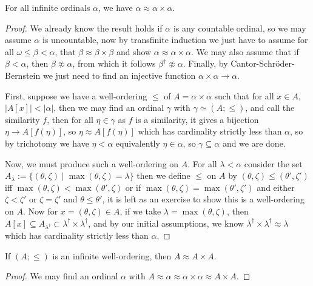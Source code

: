\documentclass{article}
\begin{document}
\begin{theorem}
    For all infinite ordinals $\alpha$, we have $\alpha\approx \alpha\times\alpha$.\begin{proof}
        We already know the result holds if $\alpha$ is any countable ordinal, so we may assume $\alpha$ is uncountable, now by transfinite induction we just have to assume for all $\omega\leq \beta < \alpha$, that $\beta \approx \beta \times \beta$ and show $\alpha \approx \alpha \times \alpha$. We may also assume that if $\beta < \alpha$, then $\beta \not\approx \alpha$, from which it follows $\beta^\dagger \not\approx \alpha$. Finally, by Cantor-Schr\"oder-Bernstein we just need to find an injective function $\alpha\times \alpha\rightarrow \alpha$.

        First, suppose we have a well-ordering $\leq$ of $A = \alpha \times \alpha$ such that for all $x\in A$, $|A[x]| < |\alpha|$, then we may find an ordinal $\gamma$ with $\gamma\simeq (A;\leq)$, and call the similarity $f$, then for all $\eta \in \gamma$ as $f$ is a similarity, it gives a bijection $\eta\rightarrow A[f(\eta)]$, so $\eta \approx A[f(\eta)]$ which has cardinality strictly less than $\alpha$, so by trichotomy we have $\eta < \alpha$ equivalently $\eta\in \alpha$, so $\gamma \subseteq \alpha$ and we are done.

        Now, we must produce such a well-ordering on $A$. For all $\lambda < \alpha$ consider the set $A_\lambda := \{(\theta,\zeta) \mid \max(\theta,\zeta) = \lambda\}$ then we define $\leq$ on $A$ by $(\theta,\zeta) \leq (\theta',\zeta')$ iff $\max(\theta,\zeta) < \max(\theta',\zeta)$ or if $\max(\theta,\zeta) = \max(\theta',\zeta')$ and either $\zeta < \zeta'$ or $\zeta = \zeta'$ and $\theta\leq \theta'$, it is left as an exercise to show this is a well-ordering on $A$. Now for $x = (\theta,\zeta)\in A$, if we take $\lambda = \max(\theta,\zeta)$, then $A[x]\subseteq A_{\lambda^\dagger}\subset \lambda^\dagger\times \lambda^\dagger$, and by our initial assumptions, we know $\lambda^\dagger \times \lambda^\dagger \approx \lambda$ which has cardinality strictly less than $\alpha$.
    \end{proof}
\end{theorem}

\begin{corollary}
    If $(A;\leq)$ is an infinite well-ordering, then $A\approx A\times A$.
    \begin{proof}
        We may find an ordinal $\alpha$ with $A\approx \alpha \approx \alpha\times \alpha \approx A\times A$.
    \end{proof}
\end{corollary}
\end{document}
